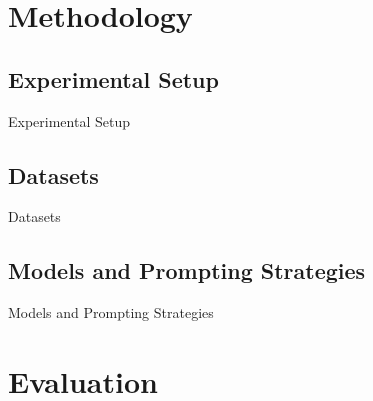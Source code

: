 \documentclass[aspectratio=169]{beamer}
\begin{document}
\section{Methodology}
\subsection{Experimental Setup}
\begin{frame}{Experimental Setup}
\end{frame}

\subsection{Datasets}
\begin{frame}{Datasets}
\end{frame}

\subsection{Models and Prompting Strategies}
\begin{frame}{Models and Prompting Strategies}
\end{frame}

\section{Evaluation}
\end{document}
